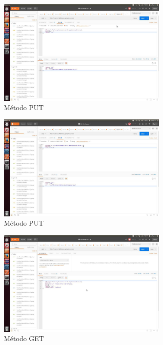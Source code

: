 \documentclass[12pt,a4paper, spanish]{article}
\begin{document}
\begin{figure}[H]
	\centering
	\includegraphics[width=0.75\textwidth]{images/captura12.jpg}
	\caption{Método PUT}
\end{figure}

\begin{figure}[H]
	\centering
	\includegraphics[width=0.75\textwidth]{images/captura13.jpg}
	\caption{Método PUT}
\end{figure}

\begin{figure}[H]
	\centering
	\includegraphics[width=0.75\textwidth]{images/captura14.jpg}
	\caption{Método GET}
\end{figure}
\end{document}
